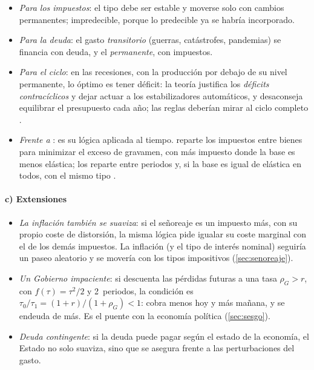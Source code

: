 \documentclass[11pt]{article}
\begin{document}
\begin{itemize}
\item \emph{Para los impuestos}: el tipo debe ser estable y moverse solo con cambios permanentes; impredecible, porque lo predecible ya se habría incorporado.
\item \emph{Para la deuda}: el gasto \emph{transitorio} (guerras, catástrofes, pandemias) se financia con deuda, y el \emph{permanente}, con impuestos.
\item \emph{Para el ciclo}: en las recesiones, con la producción por debajo de su nivel permanente, lo óptimo es tener déficit: la teoría justifica los \emph{déficits contracíclicos} y dejar actuar a los estabilizadores automáticos, y desaconseja equilibrar el presupuesto cada año; las reglas deberían mirar al ciclo completo .
\item \emph{Frente a }: es su lógica aplicada al tiempo.  reparte los impuestos entre bienes para minimizar el exceso de gravamen, con más impuesto donde la base es menos elástica;  los reparte entre periodos y, si la base es igual de elástica en todos, con el mismo tipo .
\end{itemize}

\paragraph{c) Extensiones}

\begin{itemize}
\item \emph{La inflación también se suaviza}: si el señoreaje es un impuesto más, con su propio coste de distorsión, la misma lógica pide igualar su coste marginal con el de los demás impuestos. La inflación (y el tipo de interés nominal) seguiría un paseo aleatorio y se movería con los tipos impositivos\nocite{Mankiw1987Optimal} (\ref{sec:senoreaje}).
\item \emph{Un Gobierno impaciente}: si descuenta las pérdidas futuras a una tasa $\rho_G>r$, con $f(\tau)=\tau^2/2$ y 2~periodos, la condición es $\tau_0/\tau_1=(1+r)/(1+\rho_G)<1$: cobra menos hoy y más mañana, y se endeuda de más. Es el puente con la economía política (\ref{sec:sesgo}).
\item \emph{Deuda contingente}: si la deuda puede pagar según el estado de la economía, el Estado no solo suaviza, sino que se asegura frente a las perturbaciones del gasto\nocite{LucasStokey1983Optimal}.
\end{itemize}
\end{document}

